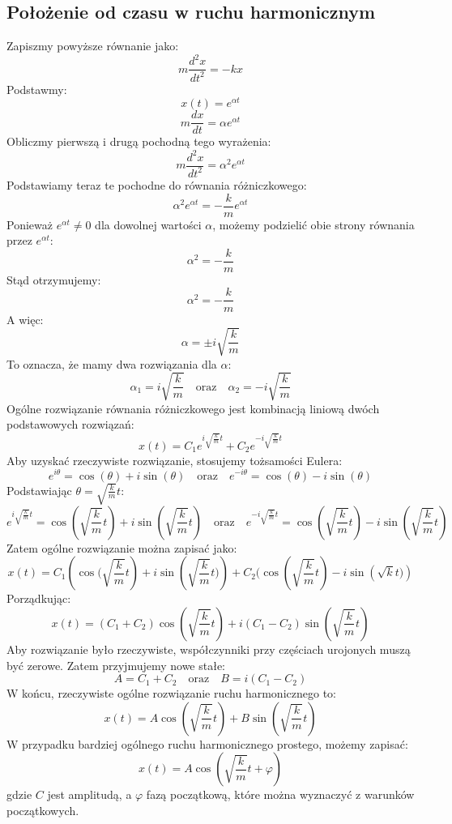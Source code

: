 \documentclass{article}
\theoremstyle{definition}
\theoremstyle{definition}
\theoremstyle{definition}
\theoremstyle{definition}
\begin{document}
\subsection{Położenie od czasu w ruchu harmonicznym}
Zapiszmy powyższe równanie jako:
\[ m\frac{d^2 x}{dt^2} = - kx \]
Podstawmy:
\[
x(t) = e^{\alpha t}
\]
\[
m\frac{dx}{dt} = \alpha e^{\alpha t}
\]
Obliczmy pierwszą i drugą pochodną tego wyrażenia:
\[
m\frac{d^2 x}{dt^2} = \alpha^2 e^{\alpha t}
\]
Podstawiamy teraz te pochodne do równania różniczkowego:
\[
\alpha^2 e^{\alpha t} = - \frac{k}{m} e^{\alpha t}
\]
Ponieważ \( e^{\alpha t} \neq 0 \) dla dowolnej wartości \( \alpha \), możemy podzielić obie strony równania przez \( e^{\alpha t} \):
\[
\alpha^2 = -\frac{k}{m}
\]
Stąd otrzymujemy:
\[
\alpha^2 = -\frac{k}{m}
\]
A więc:
\[
\alpha = \pm i\sqrt{\frac{k}{m}}
\]
To oznacza, że mamy dwa rozwiązania dla \( \alpha \):
\[
\alpha_1 = i\sqrt{\frac{k}{m}} \quad \text{oraz} \quad \alpha_2 = -i\sqrt{\frac{k}{m}}
\]
Ogólne rozwiązanie równania różniczkowego jest kombinacją liniową dwóch podstawowych rozwiązań:
\[
x(t) = C_1 e^{i\sqrt{\frac{k}{m}} t} + C_2 e^{-i\sqrt{\frac{k}{m}} t}
\]
Aby uzyskać rzeczywiste rozwiązanie, stosujemy tożsamości Eulera:
\[
e^{i\theta} = \cos(\theta) + i\sin(\theta) \quad \text{oraz} \quad e^{-i\theta} = \cos(\theta) - i\sin(\theta)
\]
Podstawiając \( \theta = \sqrt{\frac{k}{m}} t \):
\[
e^{i\sqrt{\frac{k}{m}} t} = \cos\left(\sqrt{\frac{k}{m}} t\right) + i\sin\left(\sqrt{\frac{k}{m}} t\right) \quad \text{oraz} \quad e^{-i\sqrt{\frac{k}{m}} t} = \cos\left(\sqrt{\frac{k}{m}} t\right) - i\sin\left(\sqrt{\frac{k}{m}} t\right)
\]
Zatem ogólne rozwiązanie można zapisać jako:
\[
x(t) = C_1 \left(\cos(\sqrt{\frac{k}{m}} t\right) + i\sin\left(\sqrt{\frac{k}{m}} t)\right) + C_2 (\cos\left(\sqrt{\frac{k}{m}} t\right) - i\sin\left(\sqrt{k} t)\right)
\]
Porządkując:
\[
x(t) = (C_1 + C_2) \cos\left(\sqrt{\frac{k}{m}} t\right) + i(C_1 - C_2) \sin\left(\sqrt{\frac{k}{m}} t\right)
\]
Aby rozwiązanie było rzeczywiste, współczynniki przy częściach urojonych muszą być zerowe. Zatem przyjmujemy nowe stałe:
\[
A = C_1 + C_2 \quad \text{oraz} \quad B = i(C_1 - C_2)
\]
W końcu, rzeczywiste ogólne rozwiązanie ruchu harmonicznego to:
\[
x(t) = A \cos\left(\sqrt{\frac{k}{m}} t\right) + B \sin\left(\sqrt{\frac{k}{m}} t\right)
\]
W przypadku bardziej ogólnego ruchu harmonicznego prostego, możemy zapisać:
\[
\boxed{
x(t) = A \cos\left(\sqrt{\frac{k}{m}} t + \varphi\right)
}
\]
gdzie \( C \) jest amplitudą, a \( \varphi \) fazą początkową, które można wyznaczyć z warunków początkowych.
\end{document}

